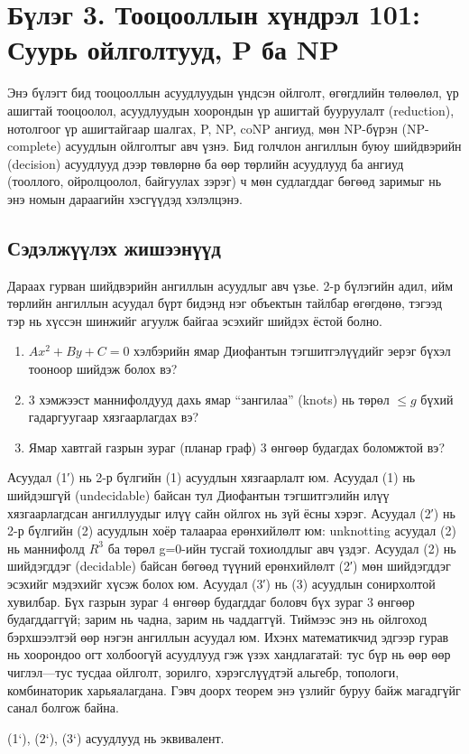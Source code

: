 \chapter{Бүлэг 3. Тооцооллын хүндрэл 101: Суурь ойлголтууд, P ба NP}
\label{chap:regular}

Энэ бүлэгт бид тооцооллын асуудлуудын үндсэн ойлголт, өгөгдлийн төлөөлөл, үр ашигтай тооцоолол, асуудлуудын хоорондын үр ашигтай бууруулалт (reduction), нотолгоог үр ашигтайгаар шалгах, P, NP, coNP ангиуд, мөн NP-бүрэн (NP-complete) асуудлын ойлголтыг авч үзнэ. Бид голчлон ангиллын буюу шийдвэрийн (decision) асуудлууд дээр төвлөрнө ба өөр төрлийн асуудлууд ба ангиуд (тооллого, ойролцоолол, байгуулах зэрэг) ч мөн судлагддаг бөгөөд заримыг нь энэ номын дараагийн хэсгүүдэд хэлэлцэнэ.

\section{Сэдэлжүүлэх жишээнүүд}
Дараах гурван шийдвэрийн ангиллын асуудлыг авч үзье. 2-р бүлэгийн адил, ийм төрлийн ангиллын асуудал бүрт бидэнд нэг объектын тайлбар өгөгдөнө, тэгээд тэр нь хүссэн шинжийг агуулж байгаа эсэхийг шийдэх ёстой болно.

\begin{enumerate}
  \item $Ax^2+By+C=0$ хэлбэрийн ямар Диофантын тэгшитгэлүүдийг эерэг бүхэл тооноор шийдэж болох вэ?
  \item 3 хэмжээст маннифолдууд дахь ямар “зангилаа” (knots) нь төрөл $\le g$ бүхий гадаргуугаар хязгаарлагдах вэ?
  \item Ямар хавтгай газрын зураг (планар граф) 3 өнгөөр будагдах боломжтой вэ?
\end{enumerate}

Асуудал (1′) нь 2-р бүлгийн (1) асуудлын хязгаарлалт юм. Асуудал (1) нь шийдэшгүй (undecidable) байсан тул Диофантын тэгшитгэлийн илүү хязгаарлагдсан ангиллуудыг илүү сайн ойлгох нь зүй ёсны хэрэг. Асуудал (2′) нь 2-р бүлгийн (2) асуудлын хоёр талаараа ерөнхийлөлт юм: unknotting асуудал (2) нь маннифолд $R^3$ ба төрөл g=0-ийн тусгай тохиолдлыг авч үздэг. Асуудал (2) нь шийдэгддэг (decidable) байсан бөгөөд түүний ерөнхийлөлт (2′) мөн шийдэгддэг эсэхийг мэдэхийг хүсэж болох юм. Асуудал (3′) нь (3) асуудлын сонирхолтой хувилбар. Бүх газрын зураг 4 өнгөөр будагддаг боловч бүх зураг 3 өнгөөр будагддаггүй; зарим нь чадна, зарим нь чаддаггүй. Тиймээс энэ нь ойлгоход бэрхшээлтэй өөр нэгэн ангиллын асуудал юм.
Ихэнх математикчид эдгээр гурав нь хоорондоо огт холбоогүй асуудлууд гэж үзэх хандлагатай: тус бүр нь өөр өөр чиглэл—тус тусдаа ойлголт, зорилго, хэрэгслүүдтэй альгебр, топологи, комбинаторик харьяалагдана. Гэвч доорх теорем энэ үзлийг буруу байж магадгүйг санал болгож байна.


\begin{theorem}
  (1`), (2`), (3`) асуудлууд нь эквивалент.
\end{theorem}

